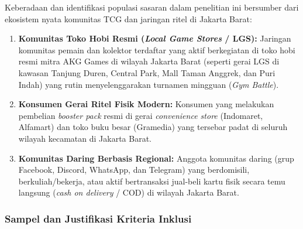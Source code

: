 \documentclass[12pt,a4paper]{article}
\numberwithin{equation}{section}
\numberwithin{table}{section}
\numberwithin{figure}{section}
\begin{document}
Keberadaan dan identifikasi populasi sasaran dalam penelitian ini bersumber dari ekosistem nyata komunitas TCG dan jaringan ritel di Jakarta Barat:
\begin{enumerate}
  \item \textbf{Komunitas Toko Hobi Resmi (\emph{Local Game Stores} / LGS):} Jaringan komunitas pemain dan kolektor terdaftar yang aktif berkegiatan di toko hobi resmi mitra AKG Games di wilayah Jakarta Barat (seperti gerai LGS di kawasan Tanjung Duren, Central Park, Mall Taman Anggrek, dan Puri Indah) yang rutin menyelenggarakan turnamen mingguan (\emph{Gym Battle}).
  \item \textbf{Konsumen Gerai Ritel Fisik Modern:} Konsumen yang melakukan pembelian \emph{booster pack} resmi di gerai \emph{convenience store} (Indomaret, Alfamart) dan toko buku besar (Gramedia) yang tersebar padat di seluruh wilayah kecamatan di Jakarta Barat.
  \item \textbf{Komunitas Daring Berbasis Regional:} Anggota komunitas daring (grup Facebook, Discord, WhatsApp, dan Telegram) yang berdomisili, berkuliah/bekerja, atau aktif bertransaksi jual-beli kartu fisik secara temu langsung (\emph{cash on delivery} / COD) di wilayah Jakarta Barat.
\end{enumerate}

\subsubsection{Sampel dan Justifikasi Kriteria Inklusi}
\end{document}

